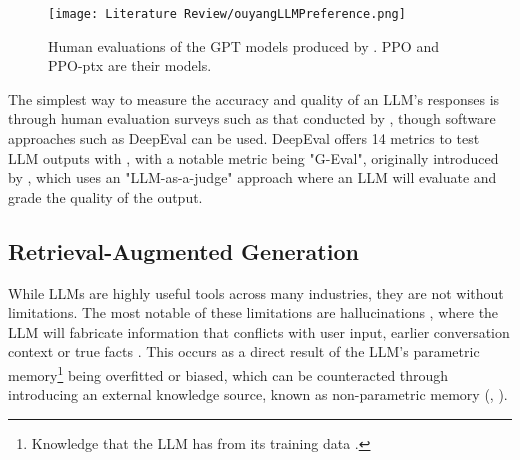 
\begin{figure}[H] 
    \centering
    \texttt{[image: Literature Review/ouyangLLMPreference.png]}
    \caption{Human evaluations of the GPT models produced by \textcite{ouyang_training_2022}. PPO and PPO-ptx are their models.}
    \label{fig:LLMPref}
\end{figure}

The simplest way to measure the accuracy and quality of an LLM's responses is through human evaluation surveys such as that conducted by \textcite{ouyang_training_2022}, though
software approaches such as DeepEval can be used. DeepEval offers 14 metrics to test LLM outputs with \autocite{deepeval_introduction_2024},
with a notable metric being "G-Eval", originally introduced by \textcite{liu_g-eval_2023}, which uses an "LLM-as-a-judge" approach where an LLM will evaluate
and grade the quality of the output.


\subsection{Retrieval-Augmented Generation}

While LLMs are highly useful tools across many industries, they are not without limitations. The most notable 
of these limitations are hallucinations \autocite{lewis_retrieval-augmented_2021}, where the LLM will fabricate 
information that conflicts with user input, earlier conversation context or true facts \autocite{zhang_sirens_2023}. This occurs as a direct result of the LLM's parametric memory\footnote{Knowledge that the LLM has from its training data \autocite{siriwardhana_improving_2023}.}
being overfitted or biased, which can be counteracted through introducing an external knowledge source, known as non-parametric memory (\textcite{komeili_internet-augmented_2022}, \textcite{siriwardhana_improving_2023}).

